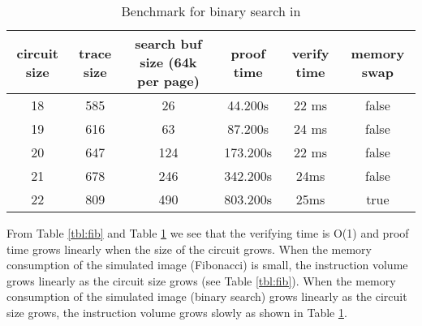 \begin{table}[!h]
\small
\begin{center}
\caption{Benchmark for binary search in \zkwasm}
\label{tbl:bsearch}
\begin{tabular}{ | c | c | c | c | c | c | }
  \hline
  circuit size & trace size & search buf size (64k per page) & proof time & verify time & memory swap\\ 
  \hline
  18 & 585 & 26 & 44.200s & 22 ms & false\\
  \hline
    19 & 616 & 63 & 87.200s & 24 ms & false \\
  \hline
    20 & 647 & 124 & 173.200s & 22 ms & false \\
  \hline
    21 & 678 & 246 & 342.200s & 24ms & false\\
  \hline
    22 & 809 & 490 & 803.200s & 25ms & true \\
  \hline
\end{tabular}

\end{center}
\end{table}

From Table \ref{tbl:fib} and Table \ref{tbl:bsearch} we see that the verifying time is O(1) and proof time grows linearly when the size of the circuit grows. When the memory consumption of the simulated image (Fibonacci) is small, the instruction volume grows linearly as the circuit size grows (see Table \ref{tbl:fib}). When the memory consumption of the simulated image (binary search) grows linearly as the circuit size grows, the instruction volume grows slowly as shown in Table \ref{tbl:bsearch}.


